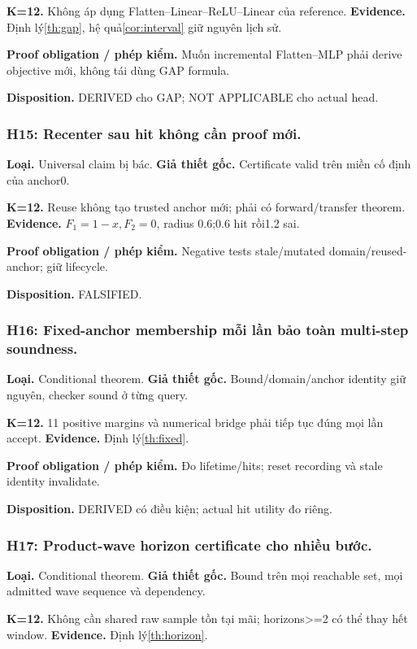 \documentclass[11pt,a4paper]{article}
\theoremstyle{remark}
\begin{document}
\textbf{K=12.} Không áp dụng Flatten--Linear--ReLU--Linear của reference. \textbf{Evidence.} Định lý\ref{th:gap}, hệ quả\ref{cor:interval} giữ nguyên lịch sử.

\textbf{Proof obligation / phép kiểm.} Muốn incremental Flatten--MLP phải derive objective mới, không tái dùng GAP formula.

\textbf{Disposition.} DERIVED cho GAP; NOT APPLICABLE cho actual head.

\subsubsection*{H15: Recenter sau hit không cần proof mới.}
\textbf{Loại.} Universal claim bị bác. \textbf{Giả thiết gốc.} Certificate valid trên miền cố định của anchor0.

\textbf{K=12.} Reuse không tạo trusted anchor mới; phải có forward/transfer theorem. \textbf{Evidence.} $F_1=1-x,F_2=0$, radius 0.6;0.6 hit rồi1.2 sai.

\textbf{Proof obligation / phép kiểm.} Negative tests stale/mutated domain/reused-anchor; giữ lifecycle.

\textbf{Disposition.} FALSIFIED.

\subsubsection*{H16: Fixed-anchor membership mỗi lần bảo toàn multi-step soundness.}
\textbf{Loại.} Conditional theorem. \textbf{Giả thiết gốc.} Bound/domain/anchor identity giữ nguyên, checker sound ở từng query.

\textbf{K=12.} 11 positive margins và numerical bridge phải tiếp tục đúng mọi lần accept. \textbf{Evidence.} Định lý\ref{th:fixed}.

\textbf{Proof obligation / phép kiểm.} Đo lifetime/hits; reset recording và stale identity invalidate.

\textbf{Disposition.} DERIVED có điều kiện; actual hit utility đo riêng.

\subsubsection*{H17: Product-wave horizon certificate cho nhiều bước.}
\textbf{Loại.} Conditional theorem. \textbf{Giả thiết gốc.} Bound trên mọi reachable set, mọi admitted wave sequence và dependency.

\textbf{K=12.} Không cần shared raw sample tồn tại mãi; horizons>=2 có thể thay hết window. \textbf{Evidence.} Định lý\ref{th:horizon}.
\end{document}
